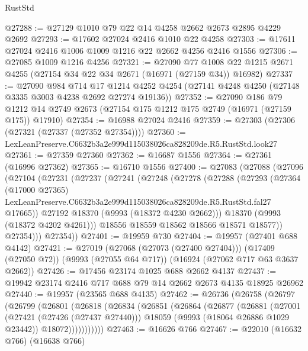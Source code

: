\begin{lexlean}{RustStd}
\begin{coremodule}
@27288 := @27129 @1010 @79 @22 @14 @4258 @2662 @2673 @2895 @4229 @2692
@27293 := @17602 @27024 @2416 @1010 @22 @4258
@27303 := @17611 @27024 @2416 @1006 @1009 @1216 @22 @2662 @4256 @2416 @1556
@27306 := @27085 @1009 @1216 @4256
@27321 := @27090
    @77
    @1008
    @22
    @1215
    @2671
    @4255
    (@27154 @34 @22 @34 @2671 (@16971 (@27159 @34)) @16982)
@27337 := @27090
    @984
    @714
    @17
    @1214
    @4252
    @4254
    (@27141 @4248 @4250 (@27148 @3335 @3003 @4238 @2692 @27274 @19136))
@27352 := @27090
    @186
    @79
    @1212
    @14
    @2749
    @2673
    (@27154 @175 @1212 @175 @2749 (@16971 (@27159 @175)) @17910)
@27354 := @16988 @27024 @2416
@27359 := @27303 (@27306 (@27321 (@27337 (@27352 @27354))))
@27360 := LexLeanPreserve.C6632b3a2e999d115038026ca828209de.R5.RustStd.look27
@27361 := @27359 @27360
@27362 := @16687 @1556
@27364 := @27361 (@16996 @27362)
@27365 := @16710 @1556
@27400 := @27083
    (@27088
      (@27096
        (@27104
          (@27231
            (@27237
              (@27241
                (@27248
                  (@27278
                    (@27288
                      (@27293
                        (@27364
                          (@17000 @27365)
                          LexLeanPreserve.C6632b3a2e999d115038026ca828209de.R5.RustStd.fal27
                          @17665))
                      @27192
                      @18370
                      (@9993 (@18372 @4230 @2662)))
                    @18370
                    (@9993 (@18372 @4202 @4261)))
                  @18556
                  @18559
                  @18562
                  @18566
                  @18571
                  @18577))
              @27354)))
        @27354))
@27401 := @19959 @730
@27404 := @19957 (@27401 @688 @4142)
@27421 := @27019
    (@27068 (@27073 (@27400 @27404)))
    (@17409 (@27050 @72))
    (@9993 (@27055 @64 @717))
    (@16924 (@27062 @717 @63 @3637 @2662))
@27426 := @17456 @23174 @1025 @688 @2662 @4137
@27437 := @19942 @23174 @2416 @717 @688 @79 @14 @2662 @2673 @4135 @18925 @26962
@27440 := @19957 (@23565 @688 @4135)
@27462 := @26736
    (@26758
      (@26797
        (@26799
          (@26801
            (@26818
              (@26834
                (@26851
                  (@26864
                    (@26877
                      (@26881
                        (@27001
                          (@27421 (@27426 (@27437 @27440)))
                          @18059
                          (@9993 (@18064 @26886 @1029 @23442))
                          @18072)))))))))))
@27463 := @16626 @766
@27467 := @22010 (@16632 @766) (@16638 @766)

\end{coremodule}
\end{lexlean}
